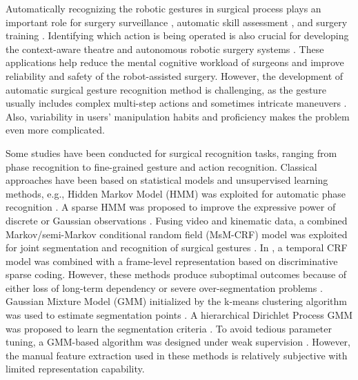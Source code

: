 \documentclass[letterpaper, 10 pt, conference]{ieeeconf}
\begin{document}
Automatically recognizing the robotic gestures in surgical process plays an important role for surgery surveillance \cite{dipietro2019segmenting}, automatic skill assessment \cite{reiley2009task,varadarajan2009data,poursartip2018analysis}, and surgery training \cite{ahmidi2017dataset}. Identifying which action is being operated is also crucial for developing the context-aware theatre \cite{dergachyova2016automatic} and autonomous robotic surgery systems \cite{preda2016cognitive}. These applications help reduce the mental cognitive workload of surgeons and improve reliability and safety of the robot-assisted surgery.
However, the development of automatic surgical gesture recognition method is challenging, as the gesture usually includes complex multi-step actions and sometimes intricate maneuvers \cite{tsai2019transfer}. Also, variability in users' manipulation habits and proficiency makes the problem even more complicated. 

Some studies have been conducted for surgical recognition tasks, ranging from phase recognition to fine-grained gesture and action recognition.
Classical approaches have been based on statistical models and unsupervised learning methods, e.g., Hidden Markov Model (HMM) was exploited for automatic phase recognition \cite{tran2017phase}. A sparse HMM was proposed to improve the expressive power of discrete or Gaussian observations \cite{tao2012sparse}. Fusing video and kinematic data, a combined Markov/semi-Markov conditional random field (MsM-CRF) model was exploited for joint segmentation and recognition of surgical gestures \cite{tao2013surgical}. In \cite{mavroudi2018end}, a temporal CRF model was combined with a frame-level representation based on discriminative sparse coding.
However, these methods produce suboptimal outcomes because of either loss of long-term dependency or severe over-segmentation problems \cite{liu2018deep}. Gaussian Mixture Model (GMM) initialized by the k-means clustering algorithm was used to estimate segmentation points \cite{lee2015autonomous}. A hierarchical Dirichlet Process GMM was proposed to learn the segmentation criteria \cite{krishnan2018transition}. To avoid tedious parameter tuning, a GMM-based algorithm was designed under weak supervision \cite{van2019weakly}. However, the manual feature extraction used in these methods is relatively subjective with limited representation capability.
\end{document}
